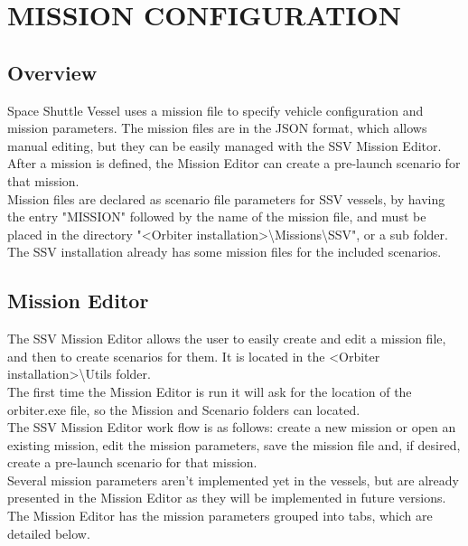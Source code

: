 \documentclass[Space_Shuttle_Vessel_Manual.tex]{subfiles}
\begin{document}
\section{MISSION CONFIGURATION}
\begin{multicols*}{2}
\label{sec:mission-configuration}
\renewcommand{\cfttoctitlefont}{\bf}
\localtableofcontents
\end{multicols*}

\begin{multicols*}{2}
\subsection{Overview}
\noindent
Space Shuttle Vessel uses a mission file to specify vehicle configuration and mission parameters. The mission files are in the JSON format, which allows manual editing, but they can be easily managed with the SSV Mission Editor. After a mission is defined, the Mission Editor can create a pre-launch scenario for that mission.\\
Mission files are declared as scenario file parameters for SSV vessels, by having the entry "MISSION" followed by the name of the mission file, and must be placed in the directory "<Orbiter installation>\textbackslash Missions\textbackslash SSV", or a sub folder.\\
The SSV installation already has some mission files for the included scenarios.


\newpage
\subsection{Mission Editor}
\noindent
The SSV Mission Editor allows the user to easily create and edit a mission file, and then to create scenarios for them. It is located in the <Orbiter installation>\textbackslash Utils folder.\\
The first time the Mission Editor is run it will ask for the location of the orbiter.exe file, so the Mission and Scenario folders can located.\\
The SSV Mission Editor work flow is as follows: create a new mission or open an existing mission, edit the mission parameters, save the mission file and, if desired, create a pre-launch scenario for that mission.\\
Several mission parameters aren't implemented yet in the vessels, but are already presented in the Mission Editor as they will be implemented in future versions.\\
The Mission Editor has the mission parameters grouped into tabs, which are detailed below.



\end{multicols*}
\end{document}
